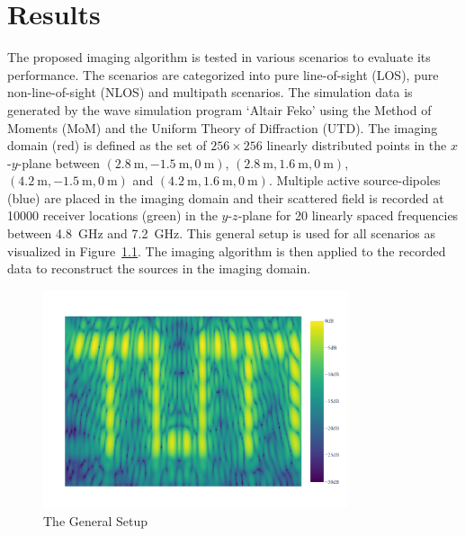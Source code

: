 
\chapter{Results}\label{chapter:results}
The proposed imaging algorithm is tested in various scenarios to evaluate its performance.
The scenarios are categorized into pure line-of-sight (LOS), pure non-line-of-sight (NLOS) and multipath scenarios.
The simulation data is generated by the wave simulation program `Altair Feko' using the Method of Moments (MoM) and the Uniform Theory of Diffraction (UTD).
The imaging domain (red) is defined as the set of \(256 \times 256\) linearly distributed points in the \(x\)-\(y\)-plane between \((\SI{2.8}{\meter}, \SI{-1.5}{\meter}, \SI{0}{\meter})\), \((\SI{2.8}{\meter}, \SI{1.6}{\meter}, \SI{0}{\meter})\), \((\SI{4.2}{\meter}, \SI{-1.5}{\meter}, \SI{0}{\meter})\) and \((\SI{4.2}{\meter}, \SI{1.6}{\meter}, \SI{0}{\meter})\).
Multiple active source-dipoles (blue) are placed in the imaging domain and their scattered field is recorded at 10000 receiver locations (green) in the \(y\)-\(z\)-plane for 20 linearly spaced frequencies between \SI{4.8}{\giga\hertz} and \SI{7.2}{\giga\hertz}.
This general setup is used for all scenarios as visualized in Figure~\ref{fig:general_setup}.
The imaging algorithm is then applied to the recorded data to reconstruct the sources in the imaging domain.

\begin{figure}[ht]
    \centering
    \includegraphics[page=3, width=0.8\textwidth]{figures/pure_los.pdf}
    \caption{The General Setup}\label{fig:general_setup}
\end{figure}


